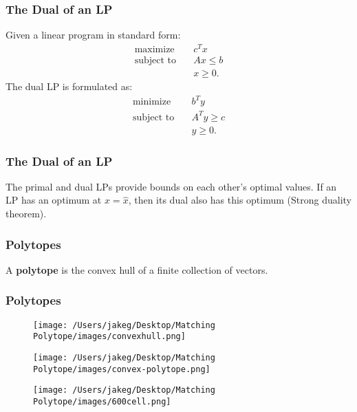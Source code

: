 \begin{frame}
    \frametitle{The Dual of an LP}

    Given a linear program in standard form:
    \begin{align*}
        \text{maximize} \quad & c^T x \\
        \text{subject to} \quad & Ax \leq b \\
                                & x \geq 0.
    \end{align*}
    \pause
    The dual LP is formulated as:
    \begin{align*}
        \text{minimize} \quad & b^T y \\
        \text{subject to} \quad & A^T y \geq c \\
                                & y \geq 0.
    \end{align*}
\end{frame}

\begin{frame}
\frametitle{The Dual of an LP}
The primal and dual LPs provide bounds on each other’s optimal values. If an LP has an optimum at \(x = \hat{x}  \), then its dual also has this optimum (Strong duality theorem).
\end{frame}

\begin{frame}
\frametitle{Polytopes}
A \textbf{polytope} is the convex hull of a finite collection of vectors.
\end{frame}

\begin{frame}
\frametitle{Polytopes}
\begin{figure}
        \centering
        \begin{minipage}{0.32\textwidth}
            \centering
            \texttt{[image: /Users/jakeg/Desktop/Matching Polytope/images/convexhull.png]}
        \end{minipage}\hfill\pause
        \begin{minipage}{0.32\textwidth}
            \centering
            \texttt{[image: /Users/jakeg/Desktop/Matching Polytope/images/convex-polytope.png]}
        \end{minipage}\hfill\pause
        \begin{minipage}{0.32\textwidth}
            \centering
            \texttt{[image: /Users/jakeg/Desktop/Matching Polytope/images/600cell.png]}
        \end{minipage}
\end{figure}
\end{frame}

